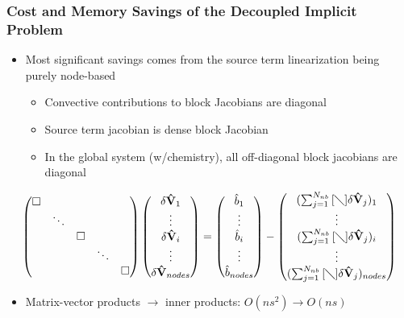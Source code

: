 \documentclass{beamer}
\begin{document}
\begin{frame}
  \frametitle{Cost and Memory Savings of the Decoupled Implicit Problem}
\begin{itemize}
  \item Most significant savings comes from the source term linearization being purely node-based
    \begin{itemize}
      \item Convective contributions to block Jacobians are diagonal
      \item Source term jacobian is dense block Jacobian
      \item In the global system (w/chemistry), all off-diagonal block jacobians
        are diagonal
    \end{itemize}
  \end{itemize}
  \[
    \begin{pmatrix} 
      \Box & & & & \\ 
      & \ddots & & & \\ 
      & & \Box \\ 
      & & & \ddots & \\ 
      & & & & \Box
    \end{pmatrix} \begin{pmatrix} \delta \mathbf{\hat{V}}_1 \\ \vdots \\ \delta
      \mathbf{\hat{V}}_i \\ \vdots \\ \delta \mathbf{\hat{V}}_{nodes}
    \end{pmatrix} = \begin{pmatrix} \hat{b}_1 \\ \vdots \\ \hat{b}_i \\ \vdots \\
      \hat{b}_{nodes} \end{pmatrix} - \begin{pmatrix}
      (\sum_{j=1}^{N_{nb}}{[\diagdown] \delta\mathbf{\hat{V}}_{j}})_1 \\ \vdots \\
      (\sum_{j=1}^{N_{nb}}{[\diagdown] \delta\mathbf{\hat{V}}_{j}})_i \\ \vdots \\
      (\sum_{j=1}^{N_{nb}}{[\diagdown] \delta\mathbf{\hat{V}}_{j}})_{nodes}
    \end{pmatrix} 
  \]
  \begin{itemize}
    \item Matrix-vector products $\to$ inner products: $O(ns^2) \to O(ns)$
  \end{itemize}
\end{frame}
\end{document}
